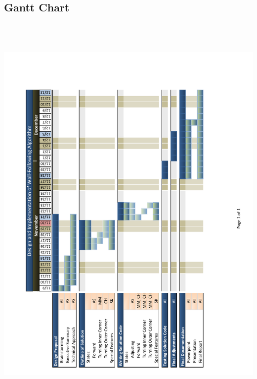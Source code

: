 \titleformat{\section}{\LARGE\bfseries}{\appendixname\:\thesection:}{1em}{}{}

\newpage
\begin{appendices}
\section{Gantt Chart}
\begin{center}
\includegraphics[height = 8in]{graphics/gantt_chart}
\end{center}
\end{appendices}